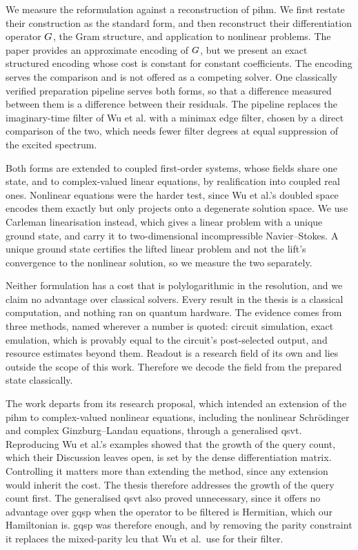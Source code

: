 We measure the reformulation against a reconstruction of \gls{pihm}. We first restate their construction as the standard form, and then reconstruct their differentiation operator $G$, the Gram structure, and application to nonlinear problems. The paper provides an approximate encoding of $G$, but we present an exact structured encoding whose cost is constant for constant coefficients. The encoding serves the comparison and is not offered as a competing solver. One classically verified preparation pipeline serves both forms, so that a difference measured between them is a difference between their residuals. The pipeline replaces the imaginary-time filter of Wu et al. with a minimax edge filter, chosen by a direct comparison of the two, which needs fewer filter degrees at equal suppression of the excited spectrum.

Both forms are extended to coupled first-order systems, whose fields share one state, and to complex-valued linear equations, by realification into coupled real ones. Nonlinear equations were the harder test, since Wu et al.'s doubled space encodes them exactly but only projects onto a degenerate solution space. We use Carleman linearisation instead, which gives a linear problem with a unique ground state, and carry it to two-dimensional incompressible Navier--Stokes. A unique ground state certifies the lifted linear problem and not the lift's convergence to the nonlinear solution, so we measure the two separately.

Neither formulation has a cost that is polylogarithmic in the resolution, and we claim no advantage over classical solvers. Every result in the thesis is a classical computation, and nothing ran on quantum hardware. The evidence comes from three methods, named wherever a number is quoted: circuit simulation, exact emulation, which is provably equal to the circuit's post-selected output, and resource estimates beyond them. Readout is a research field of its own and lies outside the scope of this work. Therefore we decode the field from the prepared state classically.

The work departs from its research proposal, which intended an extension of the \gls{pihm} to complex-valued nonlinear equations, including the nonlinear Schr\"odinger and complex Ginzburg--Landau equations, through a generalised \gls{qsvt}. Reproducing Wu et al.'s examples showed that the growth of the query count, which their Discussion leaves open, is set by the dense differentiation matrix. Controlling it matters more than extending the method, since any extension would inherit the cost. The thesis therefore addresses the growth of the query count first. The generalised \gls{qsvt} also proved unnecessary, since it offers no advantage over \gls{gqsp} when the operator to be filtered is Hermitian, which our Hamiltonian is. \gls{gqsp} was therefore enough, and by removing the parity constraint it replaces the mixed-parity \gls{lcu} that Wu et al.\ use for their filter.

